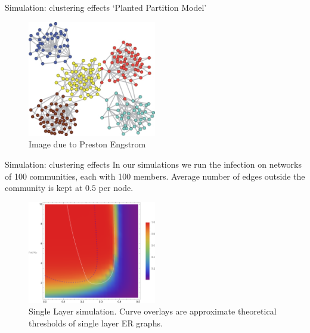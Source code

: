 \documentclass[10pt, xcolor=dvipsnames]{beamer}
\begin{document}
\begin{frame}{Simulation: clustering effects}
`Planted Partition Model'
\begin{figure}
\centering
\includegraphics[width=0.5\textwidth]{figures/communities}
\caption{Image due to Preston Engstrom}
\end{figure}
\end{frame}

\begin{frame}{Simulation: clustering effects}
In our simulations we run the infection on networks of 100 communities, each with 100 members. Average number of edges outside the community is kept at $0.5$ per node.

\begin{figure}
\centering
\includegraphics[width=0.5\textwidth]{figures/pp_single_with_er_cascade_overlay}
\caption{Single Layer simulation. Curve overlays are approximate theoretical thresholds of single layer ER graphs.}
\end{figure}
\end{frame}
\end{document}
